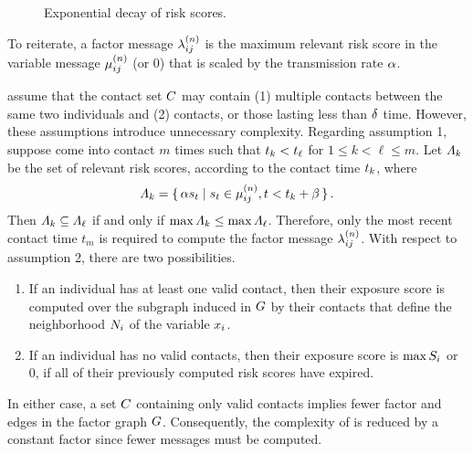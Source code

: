 \begin{figure}[htb]
\centering
{}
\caption[Exponential decay of risk scores]{Exponential decay of risk scores.}
\label{fig:decay}
\end{figure}

To reiterate, a factor message $\lambda_{ij}^{(n)}$ is the maximum relevant risk score in the variable message $\mu_{ij}^{(n)}$ (or 0) that is scaled by the transmission rate $\alpha$.

\citet{Ayday2021} assume that the contact set $C$ may contain (1) multiple contacts between the same two individuals and (2)  contacts, or those lasting less than $\delta$ time. However, these assumptions introduce unnecessary complexity. Regarding assumption 1, suppose  come into contact $m$ times such that $t_k < t_\ell$ for $1 \leq k < \ell \leq m$. Let $\varLambda_k$ be the set of relevant risk scores, according to the contact time $t_k$, where
\begin{equation*}
  \varLambda_k = \set{ \alpha s_t | s_t\in \mu_{ij}^{(n)}, t< t_k + \beta}.
\end{equation*}
Then $\varLambda_k \subseteq \varLambda_\ell$ if and only if $\max \varLambda_k \leq \max \varLambda_\ell$. Therefore, only the most recent contact time $t_m$ is required to compute the factor message $\lambda_{ij}^{(n)}$. With respect to assumption 2, there are two possibilities.
\begin{enumerate}
  \item If an individual has at least one valid contact, then their exposure score is computed over the subgraph induced in $G$ by their contacts that define the neighborhood $N_i$ of the variable \vertexName $\vVariable_i$.
  \item If an individual has no valid contacts, then their exposure score is $\max S_i$ or $0$, if all of their previously computed risk scores have expired.
\end{enumerate}
In either case, a set $C$ containing only valid contacts implies fewer factor \verticesName and edges in the factor graph $G$. Consequently, the complexity of \cRiskPropagation is reduced by a constant factor since fewer messages must be computed.

